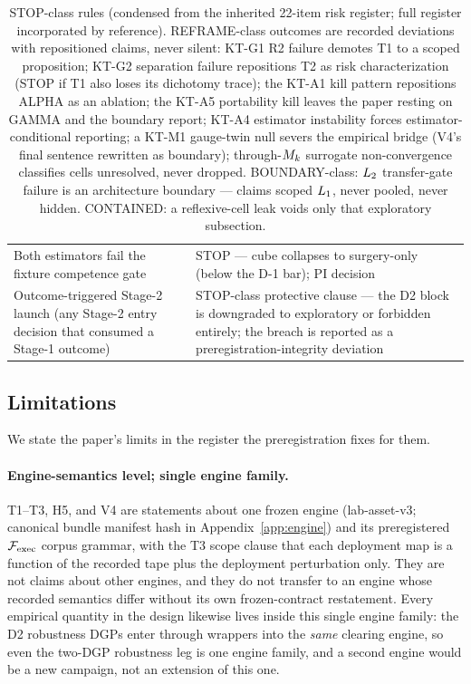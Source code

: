\begin{table}[t]
\begin{tabular}{p{6.4cm}p{8.6cm}}
Both estimators fail the fixture competence gate & STOP --- cube collapses to
surgery-only (below the D-1 bar); PI decision \\
Outcome-triggered Stage-2 launch (any Stage-2 entry decision that consumed a
Stage-1 outcome) & STOP-class protective clause --- the D2 block is
downgraded to exploratory or forbidden entirely; the breach is reported as a
preregistration-integrity deviation \\
\bottomrule
\end{tabular}
\caption{STOP-class rules (condensed from the inherited 22-item risk
register; full register incorporated by reference). REFRAME-class outcomes
are recorded deviations with repositioned claims, never silent: KT-G1 R2
failure demotes T1 to a scoped proposition; KT-G2 separation failure
repositions T2 as risk characterization (STOP if T1 also loses its
dichotomy trace); the KT-A1 kill pattern repositions ALPHA as an ablation;
the KT-A5 portability kill leaves the paper resting on GAMMA and the
boundary report; KT-A4 estimator instability forces estimator-conditional
reporting; a KT-M1 gauge-twin null severs the empirical bridge (V4's final
sentence rewritten as boundary); through-$M_k$ surrogate non-convergence
classifies cells unresolved, never dropped. BOUNDARY-class: $L_{2}$
transfer-gate failure is an architecture boundary --- claims scoped $L_{1}$,
never pooled, never hidden. CONTAINED: a reflexive-cell leak voids only that
exploratory subsection.}
\label{tab:stoprules}
\end{table}

\subsection{Limitations}
\label{sec:scope-limits}

We state the paper's limits in the register the preregistration fixes for
them.

\paragraph{Engine-semantics level; single engine family.}
T1--T3, H5, and V4 are statements about one frozen engine (lab-asset-v3;
canonical bundle manifest hash in Appendix~\ref{app:engine}) and its
preregistered $\mathcal{F}_{\mathrm{exec}}$ corpus grammar, with
the T3 scope clause that each deployment map is a function of the recorded
tape plus the deployment perturbation only. They are not claims about other
engines, and they do not transfer to an engine whose recorded semantics
differ without its own frozen-contract restatement. Every empirical quantity
in the design likewise lives inside this single engine family: the D2
robustness DGPs enter through wrappers into the \emph{same} clearing engine,
so even the two-DGP robustness leg is one engine family, and a second engine
would be a new campaign, not an extension of this one.

